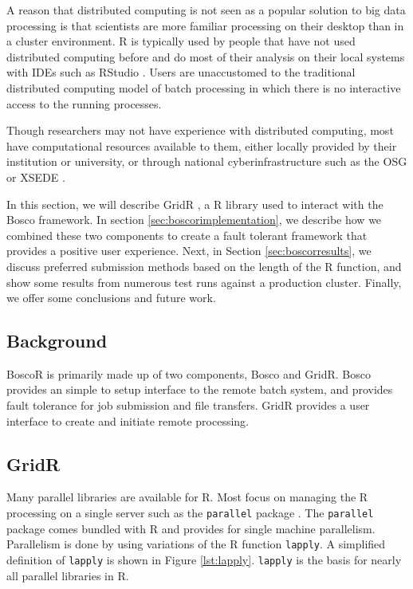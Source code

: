 A reason that distributed computing is not seen as a popular solution to big data processing is that scientists are more familiar processing on their desktop than in a cluster environment.  R is typically used by people that have not used distributed computing before and do most of their analysis on their local systems with IDEs such as RStudio \cite{racine2012rstudio}.  Users are unaccustomed to the traditional distributed computing model of batch processing in which there is no interactive access to the running processes.

Though researchers may not have experience with distributed computing, most have computational resources available to them, either locally provided by their institution or university, or through national cyberinfrastructure such as the OSG \cite{pordes2007open} or XSEDE \cite{xsede}.



In this section, we will describe GridR \cite{wegener2007gridr}, a R library used to interact with the Bosco framework.  In section \ref{sec:boscorimplementation}, we describe how we combined these two components to create a fault tolerant framework that provides a positive user experience.  Next, in Section \ref{sec:boscorresults}, we discuss preferred submission methods based on the length of the R function, and show some results from numerous test runs against a production cluster.  Finally, we offer some conclusions and future work.

\subsection{Background}
BoscoR is primarily made up of two components, Bosco and GridR.  Bosco provides an simple to setup interface to the remote batch system, and provides fault tolerance for job submission and file transfers.  GridR provides a user interface to create and initiate remote processing.


\subsection{GridR}
Many parallel libraries are available for R.  Most focus on managing the R processing on a single server such as the \texttt{parallel} package \cite{rparallelpackage}.  The \texttt{parallel} package comes bundled with R and provides for single machine parallelism.  Parallelism is done by using variations of the R function \texttt{lapply}.  A simplified definition of \texttt{lapply} is shown in Figure \ref{lst:lapply}.  \texttt{lapply} is the basis for nearly all parallel libraries in R.  

